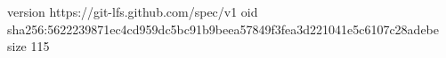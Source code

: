 version https://git-lfs.github.com/spec/v1
oid sha256:5622239871ec4cd959dc5bc91b9beea57849f3fea3d221041e5c6107c28adebe
size 115

